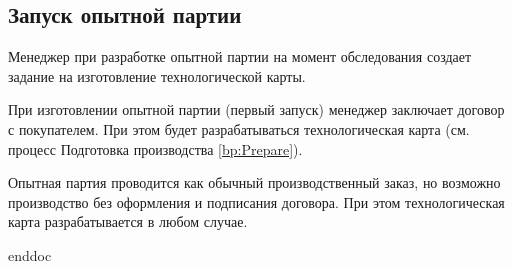 \newpage
\subsection{Запуск опытной партии}
%

Менеджер при разработке опытной партии на момент обследования создает задание на изготовление технологической карты. 

При изготовлении опытной партии (первый запуск) менеджер заключает договор с покупателем. При этом будет разрабатываться технологическая карта (см. процесс Подготовка производства \ref{bp:Prepare}).

	Опытная партия проводится как обычный производственный заказ, но возможно производство без оформления и подписания договора. При этом технологическая карта разрабатывается в любом случае.




 {enddoc}
